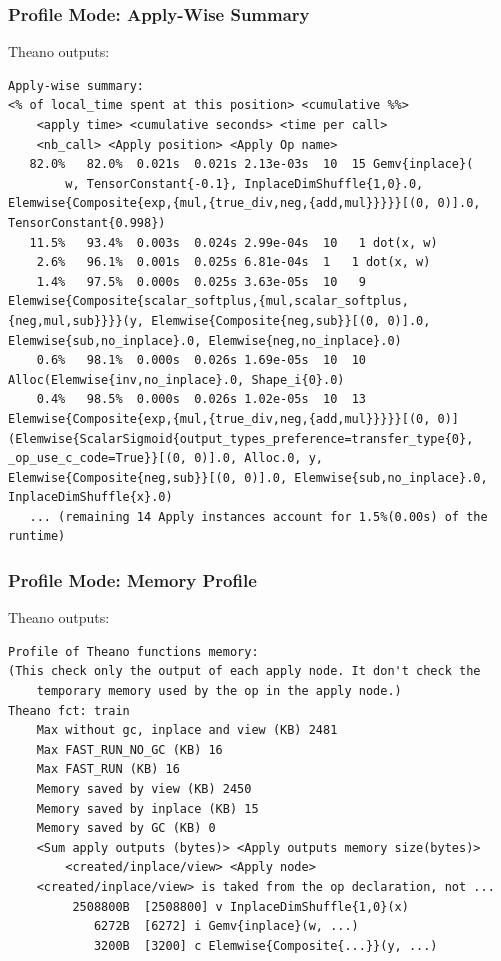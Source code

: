 \documentclass[a4paper,9pt]{beamer}
\begin{document}
\begin{frame}[fragile]
\frametitle{Profile Mode: Apply-Wise Summary}
Theano outputs:
\vfill
\begin{Verbatim}
Apply-wise summary:
<% of local_time spent at this position> <cumulative %%>
    <apply time> <cumulative seconds> <time per call>
    <nb_call> <Apply position> <Apply Op name>
   82.0%   82.0%  0.021s  0.021s 2.13e-03s  10  15 Gemv{inplace}(
        w, TensorConstant{-0.1}, InplaceDimShuffle{1,0}.0, Elemwise{Composite{exp,{mul,{true_div,neg,{add,mul}}}}}[(0, 0)].0, TensorConstant{0.998})
   11.5%   93.4%  0.003s  0.024s 2.99e-04s  10   1 dot(x, w)
    2.6%   96.1%  0.001s  0.025s 6.81e-04s  1   1 dot(x, w)
    1.4%   97.5%  0.000s  0.025s 3.63e-05s  10   9 Elemwise{Composite{scalar_softplus,{mul,scalar_softplus,{neg,mul,sub}}}}(y, Elemwise{Composite{neg,sub}}[(0, 0)].0, Elemwise{sub,no_inplace}.0, Elemwise{neg,no_inplace}.0)
    0.6%   98.1%  0.000s  0.026s 1.69e-05s  10  10 Alloc(Elemwise{inv,no_inplace}.0, Shape_i{0}.0)
    0.4%   98.5%  0.000s  0.026s 1.02e-05s  10  13 Elemwise{Composite{exp,{mul,{true_div,neg,{add,mul}}}}}[(0, 0)](Elemwise{ScalarSigmoid{output_types_preference=transfer_type{0}, _op_use_c_code=True}}[(0, 0)].0, Alloc.0, y, Elemwise{Composite{neg,sub}}[(0, 0)].0, Elemwise{sub,no_inplace}.0, InplaceDimShuffle{x}.0)
   ... (remaining 14 Apply instances account for 1.5%(0.00s) of the runtime)
\end{Verbatim}
\end{frame}

\begin{frame}[fragile]
\frametitle{Profile Mode: Memory Profile}
Theano outputs:
\vfill
\begin{Verbatim}
Profile of Theano functions memory:
(This check only the output of each apply node. It don't check the 
    temporary memory used by the op in the apply node.)
Theano fct: train
    Max without gc, inplace and view (KB) 2481
    Max FAST_RUN_NO_GC (KB) 16
    Max FAST_RUN (KB) 16
    Memory saved by view (KB) 2450
    Memory saved by inplace (KB) 15
    Memory saved by GC (KB) 0
    <Sum apply outputs (bytes)> <Apply outputs memory size(bytes)> 
        <created/inplace/view> <Apply node>
    <created/inplace/view> is taked from the op declaration, not ...
         2508800B  [2508800] v InplaceDimShuffle{1,0}(x)
            6272B  [6272] i Gemv{inplace}(w, ...)
            3200B  [3200] c Elemwise{Composite{...}}(y, ...)
\end{Verbatim}
\end{frame}
\end{document}
